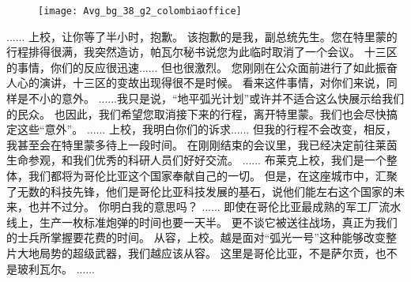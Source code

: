 \documentclass[openany]{book}
\begin{document}
\begin{figure}[h]
    \centering
    \texttt{[image: Avg\_bg\_38\_g2\_colombiaoffice]}
\end{figure}
\begin{dialogue}
     ......
     上校，让你等了半小时，抱歉。
     该抱歉的是我，副总统先生。您在特里蒙的行程排得很满，我突然造访，帕瓦尔秘书说您为此临时取消了一个会议。
     十三区的事情，你们的反应很迅速......
     但也很激烈。
     您刚刚在公众面前进行了如此振奋人心的演讲，十三区的变故出现得很不是时候。
     看来这件事情，对你们来说，同样是不小的意外。
     ......我只是说，“地平弧光计划”或许并不适合这么快展示给我们的民众。
     也因此，我们希望您取消接下来的行程，离开特里蒙。我们也会尽快搞定这些“意外”。
     ......
     上校，我明白你们的诉求......
     但我的行程不会改变，相反，我甚至会在特里蒙多待上一段时间。
     在刚刚结束的会议里，我已经决定前往莱茵生命参观，和我们优秀的科研人员们好好交流。
     ......
     布莱克上校，我们是一个整体，我们都将为哥伦比亚这个国家奉献自己的一切。
     但是，在这座城市中，汇聚了无数的科技先锋，他们是哥伦比亚科技发展的基石，说他们能左右这个国家的未来，也并不过分。
     你明白我的意思吗？
     ......
     即使在哥伦比亚最成熟的军工厂流水线上，生产一枚标准炮弹的时间也要一天半。
     更不谈它被送往战场，真正为我们的士兵所掌握要花费的时间。
     从容，上校。越是面对“弧光一号”这种能够改变整片大地局势的超级武器，我们越应该从容。
     这里是哥伦比亚，不是萨尔贡，也不是玻利瓦尔。
     ......
\end{dialogue}
\end{document}
